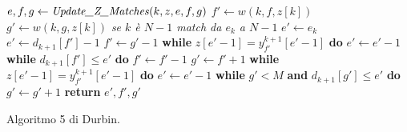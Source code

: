 \begin{algorithm}
  \begin{algorithmic}   
    \State $e,f,g\gets \mbox{\textit{Update\_Z\_Matches}}(k, z, e, f, g)$
    \EndFor
    \EndFunction    
    \State $f'\gets w(k, f, z[k])$
    \State $g'\gets w(k, g, z[k])$
    \Comment\textit{{se $k$ è $N-1$ match da $e_k$ a $N-1$}}
    \State $e'\gets e_k$
    \Else
    \State $e'\gets d_{k+1}[f']-1$
    \State $f'\gets g'-1$
    \State \textbf{while} $z[e'-1]=y_{f'}^{k+1}[e'-1]$ \textbf{do} $e'\gets
    e'-1$
    \State \textbf{while} $d_{k+1}[f']\leq e'$ \textbf{do} $f'\gets f'-1$
    \Else
    \State $g'\gets f'+1$
    \State \textbf{while} $z[e'-1]=y_{f'}^{k+1}[e'-1]$ \textbf{do}  $e'\gets
    e'-1$ 
    \State \textbf{while} $g'<M$ \textbf{and} $d_{k+1}[g']\leq e'$ \textbf{do}
    $g'\gets g'+1$ 
    \EndIf
    \EndIf
    \State \textbf{return} $e',f',g'$
    \EndFunction
  \end{algorithmic}
  \caption{Algoritmo 5 di Durbin.}
  \label{algo:dur5}
\end{algorithm}
